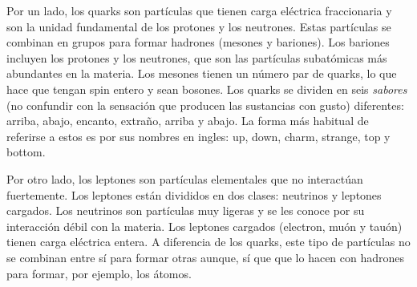 Por un lado, los quarks son partículas que tienen carga eléctrica fraccionaria y
son la unidad fundamental de los protones y los
neutrones. Estas partículas se combinan en grupos para formar hadrones (mesones y bariones). Los bariones
incluyen los protones y los neutrones, que son las partículas subatómicas más abundantes en la materia. Los 
mesones tienen un número par de quarks, lo que hace que tengan spin entero y sean bosones.
Los quarks se dividen en seis \textit{sabores}  (no confundir con la sensación que producen
las sustancias con gusto) diferentes: arriba, abajo, encanto, extraño, arriba y abajo. 
La forma más habitual de referirse a estos es por sus nombres en ingles: up, down, charm, strange,
top y bottom. 

Por otro lado, los leptones son partículas elementales que no interactúan fuertemente.
Los leptones están divididos en dos clases: neutrinos y leptones cargados.
Los neutrinos son partículas muy ligeras y se les conoce por su interacción débil con la materia.
Los leptones cargados (electron, muón y tauón) tienen carga eléctrica entera. A diferencia de los quarks,
este tipo de partículas no se combinan entre sí para formar otras aunque, sí que que lo hacen con 
hadrones para formar, por ejemplo, los átomos.


